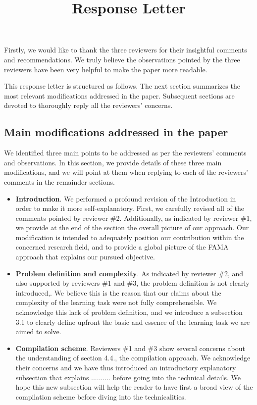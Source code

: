 \documentclass{article}
\title{\textbf{Response Letter}}
\newcommand{\FAMA}{{\small {\sffamily FAMA}}\xspace}
\begin{document}
\maketitle



Firstly, we would like to thank the three reviewers for their insightful comments and recommendations. We truly believe the observations pointed by the three reviewers have been very helpful to make the paper more readable.

This response letter is structured as follows. The next section summarizes the most relevant modifications addressed in the paper. Subsequent sections are devoted to thoroughly reply all the reviewers' concerns.


\subsection*{Main modifications addressed in the paper}

We identified three main points to be addressed as per the reviewers' comments and observations. In this section, we provide details of these three main modifications, and we will point at them when replying to each of the reviewers' comments in the remainder sections.

\begin{itemize}
\item \textbf{Introduction}. We performed a profound revision of the Introduction in order to make it more self-explanatory. First, we carefully revised all of the comments pointed by reviewer \#2. Additionally, as indicated by reviewer \#1, we provide at the end of the section the overall picture of our approach. Our modification is intended to adequately position our contribution within the concerned research field, and to provide a global picture of the \FAMA approach that explains our pursued objective.
    
\item \textbf{Problem definition and complexity}. As indicated by reviewer \#2, and also supported by reviewers \#1 and \#3, the problem definition is not clearly introduced,. We believe this is the reason that our claims about the complexity of the learning task were not fully comprehensible. We acknowledge this lack of problem definition, and we introduce a subsection 3.1 to clearly define upfront the basic and essence of the learning task we are aimed to solve.

\item \textbf{Compilation scheme}. Reviewers \#1 and \#3 show several concerns about the understanding of section 4.4., the compilation approach. We acknowledge their concerns and we have thus introduced an introductory explanatory subsection that explains .......... before going into the technical details. We hope this new subsection will help the reader to have first a broad view of the compilation scheme before diving into the technicalities.

\end{itemize}
\end{document}
